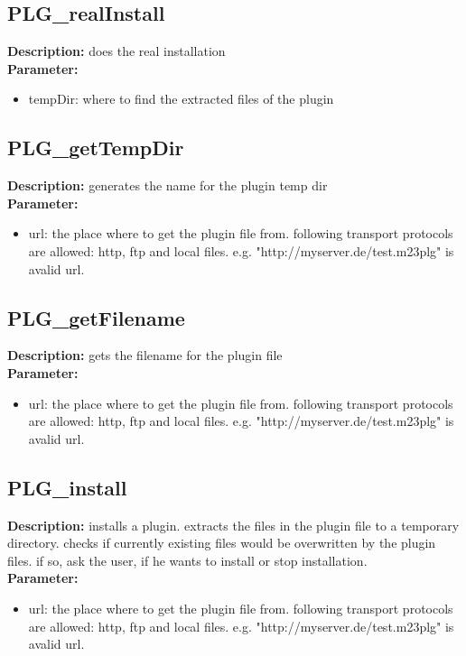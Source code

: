 \subsection{PLG\_realInstall}
\textbf{Description:} does the real installation\\
\textbf{Parameter:}
\begin{itemize}
\item tempDir: where to find the extracted files of the plugin
\end{itemize}

\subsection{PLG\_getTempDir}
\textbf{Description:} generates the name for the plugin temp dir\\
\textbf{Parameter:}
\begin{itemize}
\item url: the place where to get the plugin file from. following transport protocols are allowed: http, ftp and local files. e.g. "http://myserver.de/test.m23plg" is avalid url.
\end{itemize}

\subsection{PLG\_getFilename}
\textbf{Description:} gets the filename for the plugin file\\
\textbf{Parameter:}
\begin{itemize}
\item url: the place where to get the plugin file from. following transport protocols are allowed: http, ftp and local files. e.g. "http://myserver.de/test.m23plg" is avalid url.
\end{itemize}

\subsection{PLG\_install}
\textbf{Description:} installs a plugin. extracts the files in the plugin file to a temporary directory. checks if currently existing files would be overwritten by the plugin files. if so, ask the user, if he wants to install or stop installation.\\
\textbf{Parameter:}
\begin{itemize}
\item url: the place where to get the plugin file from. following transport protocols are allowed: http, ftp and local files. e.g. "http://myserver.de/test.m23plg" is avalid url.
\end{itemize}

